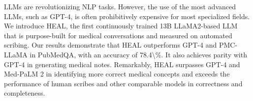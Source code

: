 LLMs are revolutionizing NLP tasks. However, the use of the most advanced LLMs, such as GPT-4, is often prohibitively expensive for most specialized fields. We introduce HEAL, the first continuously trained 13B LLaMA2-based LLM that is purpose-built for medical conversations and measured on automated scribing. Our results demonstrate that HEAL outperforms GPT-4 and PMC-LLaMA in PubMedQA, with an accuracy of 78.4\textbackslash{}\%. It also achieves parity with GPT-4 in generating medical notes. Remarkably, HEAL surpasses GPT-4 and Med-PaLM 2 in identifying more correct medical concepts and exceeds the performance of human scribes and other comparable models in correctness and completeness.